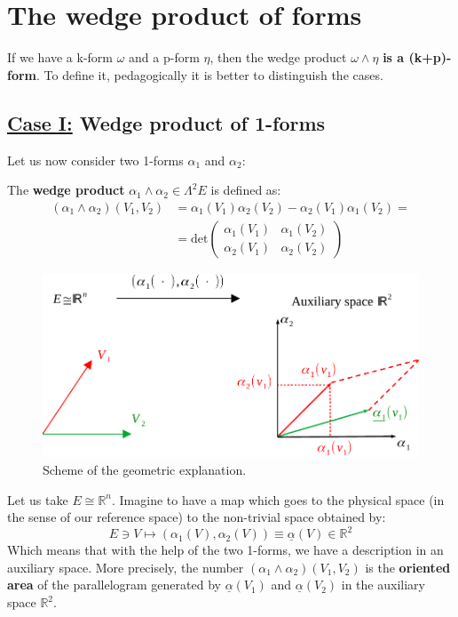 \documentclass[../main.tex]{subfiles}
\begin{document}
\section{The wedge product of forms}
If we have a k-form $\omega$ and a p-form $\eta$, then the wedge product $\omega\wedge\eta$ \textbf{is a (k+p)-form}. To define it, pedagogically it is better to distinguish the cases.
\subsection{\underline{Case I:} Wedge product of 1-forms}Let us now consider two 1-forms $\alpha_1$ and $\alpha_2$:
\begin{definition}
The \textbf{wedge product} $\alpha_1\wedge\alpha_2\in\Lambda^2 E$ is defined as:
\begin{align*}
(\alpha_1\wedge\alpha_2)(V_1,V_2)
&=\alpha_1(V_1)\alpha_2(V_2)-\alpha_2(V_1)\alpha_1(V_2)=\\
&=\textrm{det}\begin{pmatrix}
\alpha_1(V_1) & \alpha_1(V_2)\\
\alpha_2(V_1) & \alpha_2(V_2) 
\end{pmatrix}
\end{align*}
\end{definition}
\begin{figure}[H]
	\includegraphics[width=1\linewidth]{images/geom_explanation.pdf}
	\caption{Scheme of the geometric explanation.}
\end{figure}
\begin{kaobox}[frametitle=Geometric meaning]
Let us take $E\cong\mathbb{R}^n$. Imagine to have a map which goes to the physical space (in the sense of our reference space) to the non-trivial space obtained by:
\[
E\ni V \mapsto (\alpha_1(V),\alpha_2(V))\equiv\underline{\alpha}(V)\in\mathbb{R}^2
\]
Which means that with the help of the two 1-forms, we have a description in an auxiliary space. More precisely, the number $(\alpha_1\wedge\alpha_2)(V_1,V_2)$ is the \textbf{oriented area} of the parallelogram generated by $\underline{\alpha}(V_1)$ and $\underline{\alpha}(V_2)$ in the auxiliary space $\mathbb{R}^2$.
\end{kaobox}
\end{document}
